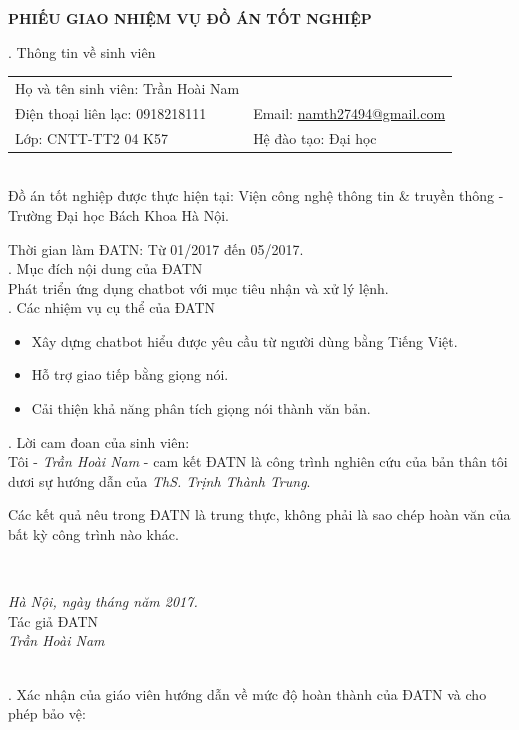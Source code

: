 \documentclass[12pt]{report}
\newcommand{\thesistitle}{Phát triển ứng dụng chatbot với mục tiêu nhận và xử lý lệnh}
\begin{document}
\setcounter{page}{1}

\begin{center}
{\large \textbf{PHIẾU GIAO NHIỆM VỤ ĐỒ ÁN TỐT NGHIỆP}}
\end{center}

. Thông tin về sinh viên\\[0.2cm]
\noindent \begin{tabular}{p{} p{}}
Họ và tên sinh viên: Trần Hoài Nam &   \\ 
Điện thoại liên lạc: 0918218111 & Email: \url{namth27494@gmail.com} \\ 
Lớp: CNTT-TT2 04 K57 & Hệ đào tạo: Đại học \\ 
\end{tabular}\\[0.3cm]
\noindent Đồ án tốt nghiệp được thực hiện tại: Viện công nghệ thông tin \& truyền thông - Trường Đại học Bách Khoa Hà Nội.

\noindent Thời gian làm ĐATN: Từ 01/2017 đến 05/2017.\\[0.4cm]
. Mục đích nội dung của ĐATN\\
\noindent \thesistitle{}.\\[0.4cm]
. Các nhiệm vụ cụ thể của ĐATN
\begin{itemize}
	\item Xây dựng chatbot hiểu được yêu cầu từ người dùng bằng Tiếng Việt.
	\item Hỗ trợ giao tiếp bằng giọng nói.
	\item Cải thiện khả năng phân tích giọng nói thành văn bản.
\end{itemize}

. Lời cam đoan của sinh viên:\\
Tôi - \textit{Trần Hoài Nam} - cam kết ĐATN là công trình nghiên cứu của bản thân tôi dươi sự hướng dẫn của \textit{ThS. Trịnh Thành Trung}.

\noindent Các kết quả nêu trong ĐATN là trung thực, không phải là sao chép hoàn văn của bất kỳ công trình nào khác.\\[0.5cm]
  
\begin{minipage}{0.3\textwidth}
\hspace{1cm}
\end{minipage}
~
\begin{minipage}{0.6\textwidth}
\centering
\textit{Hà Nội, ngày \hspace{0.3cm} tháng  \hspace{0.3cm} năm 2017.} \\
Tác giả ĐATN \\[2cm]
\textit{Trần Hoài Nam}
\end{minipage}\\[0.5cm]
. Xác nhận của giáo viên hướng dẫn về mức độ hoàn thành của ĐATN và cho phép bảo vệ:
  
\end{document}
